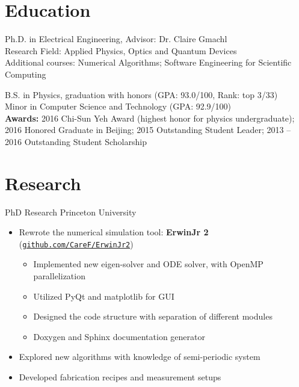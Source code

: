 \documentclass[11pt,letterpaper]{resume}
\begin{document}
\section{Education}
Ph.D. in Electrical Engineering, Advisor: Dr. Claire Gmachl \\
Research Field: Applied Physics, Optics and Quantum Devices\\
Additional courses: Numerical Algorithms; 
Software Engineering for Scientific Computing 

B.S. in Physics, graduation with honors (GPA: 93.0/100, Rank: top 3/33)\\
Minor in Computer Science and Technology (GPA: 92.9/100)\\
\textbf{Awards:}
2016 Chi-Sun Yeh Award (highest honor for physics undergraduate); 
2016 Honored Graduate in Beijing; 
2015 Outstanding Student Leader; 
2013 -- 2016 Outstanding Student Scholarship

\section{Research}
PhD Research \hfill Princeton University
\begin{itemize}
    \item Rewrote the numerical simulation tool:
    \textbf{ErwinJr 2}
    (\href{https://github.com/CareF/ErwinJr2}{\texttt{github.com/CareF/ErwinJr2}})
\begin{itemize}
    \item Implemented new eigen-solver and ODE solver, 
    with OpenMP parallelization
    \item Utilized PyQt and matplotlib for GUI
    \item Designed the code structure with separation of 
    different modules
    \item Doxygen and Sphinx documentation generator
\end{itemize}\medskip
    \item Explored new algorithms with knowledge of semi-periodic system
    \item Developed fabrication recipes and measurement setups 
\end{itemize}\medskip
\end{document}
